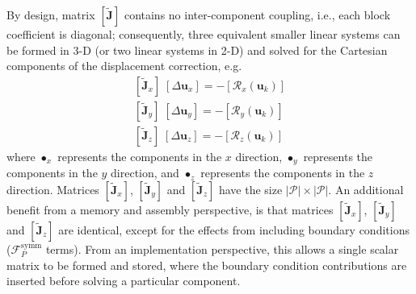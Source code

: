 \documentclass[sn-mathphys,Numbered]{sn-jnl}%
\newcommand{\bb}{\boldsymbol}
\begin{document}
By design, matrix $\left[ \bb{\tilde{J}} \right]$  contains no inter-component coupling, i.e., each block coefficient is diagonal; consequently, three equivalent smaller linear systems can be formed in 3-D (or two linear systems in 2-D) and solved for the Cartesian components of the displacement correction, e.g.
\begin{eqnarray} \label{eq:SegSysX}
     \left[ \bb{\tilde{J}}_x \right]  \;  \left[ \Delta \bb{u}_x \right] = - \left[ \mathcal{R}_x(\bb{u}_k) \right] \label{eq:segX} \\
     \left[ \bb{\tilde{J}}_y \right]  \;  \left[ \Delta \bb{u}_y \right] = - \left[ \mathcal{R}_y(\bb{u}_k) \right] \label{eq:segY} \\
     \left[ \bb{\tilde{J}}_z \right]  \;  \left[ \Delta \bb{u}_z \right] = - \left[ \mathcal{R}_z(\bb{u}_k) \right] \label{eq:segZ}
\end{eqnarray}
where $ \bullet_x$ represents the components in the $x$ direction, $ \bullet_y$ represents the components in the $y$ direction, and $ \bullet_z$ represents the components in the $z$ direction.
Matrices $\left[ \bb{\tilde{J}}_x \right]$, $ \left[ \bb{\tilde{J}}_y\right]$ and $\left[ \bb{\tilde{J}}_z\right]$ have the size $|\mathcal{P}| \times |\mathcal{P}|$.
An additional benefit from a memory and assembly perspective, is that matrices $\left[ \bb{\tilde{J}}_x \right]$, $ \left[ \bb{\tilde{J}}_y\right]$ and $\left[ \bb{\tilde{J}}_z\right]$ are identical, except for the effects from including boundary conditions ($\mathcal{F}^{\text{symm}}_P$ terms).
From an implementation perspective, this allows a single scalar matrix to be formed and stored, where the boundary condition contributions are inserted before solving a particular component.
\end{document}
